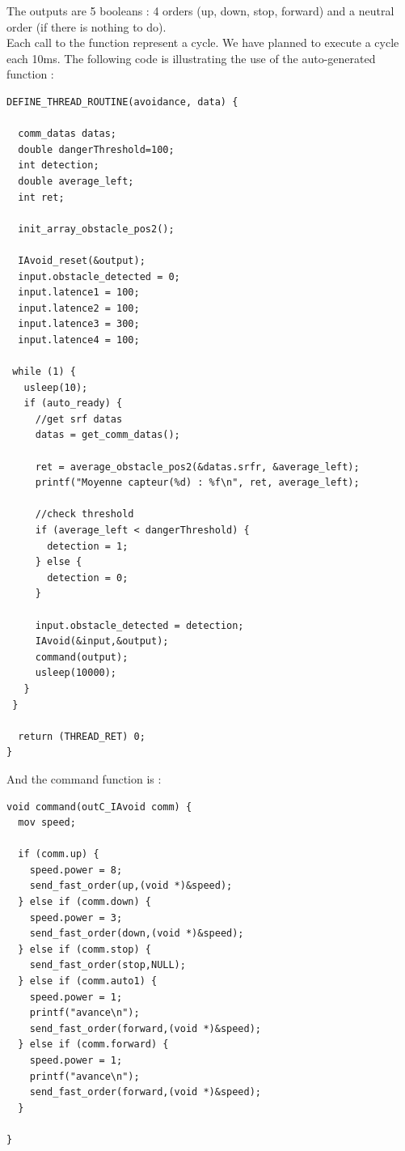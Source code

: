The outputs are 5 booleans : 4 orders (up, down, stop, forward) and a neutral order (if there is nothing to do).\\

Each call to the function represent a cycle. We have planned to execute a cycle each 10ms. The following code is illustrating the use of the auto-generated function :\\

\begin{lstlisting}
DEFINE_THREAD_ROUTINE(avoidance, data) {
  
  comm_datas datas;
  double dangerThreshold=100;
  int detection;
  double average_left;
  int ret;

  init_array_obstacle_pos2();

  IAvoid_reset(&output);
  input.obstacle_detected = 0;
  input.latence1 = 100;
  input.latence2 = 100;
  input.latence3 = 300;
  input.latence4 = 100;

 while (1) {
   usleep(10);
   if (auto_ready) {
     //get srf datas
     datas = get_comm_datas();

     ret = average_obstacle_pos2(&datas.srfr, &average_left);
     printf("Moyenne capteur(%d) : %f\n", ret, average_left);

     //check threshold
     if (average_left < dangerThreshold) {
       detection = 1;
     } else {
       detection = 0;
     } 
   
     input.obstacle_detected = detection;     
     IAvoid(&input,&output);
     command(output);
     usleep(10000);    
   }
 }
 
  return (THREAD_RET) 0;
}
\end{lstlisting}

And the command function is :\\

\begin{lstlisting}
void command(outC_IAvoid comm) {
  mov speed;

  if (comm.up) {
    speed.power = 8;
    send_fast_order(up,(void *)&speed);
  } else if (comm.down) {
    speed.power = 3;
    send_fast_order(down,(void *)&speed);
  } else if (comm.stop) {
    send_fast_order(stop,NULL);
  } else if (comm.auto1) {
    speed.power = 1;
    printf("avance\n");
    send_fast_order(forward,(void *)&speed);
  } else if (comm.forward) {
    speed.power = 1;
    printf("avance\n");
    send_fast_order(forward,(void *)&speed);
  }

}
\end{lstlisting}


